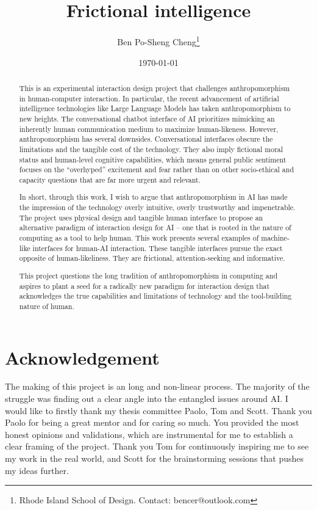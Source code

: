 \documentclass[12pt]{article}
\title{\sffamily{\small Master of Industrial Design Thesis} \\ \bfseries Frictional intelligence}
\author{Ben Po-Sheng Cheng\thanks{Rhode Island School of Design. Contact: bencer@outlook.com}}
\date{\today}
\begin{document}
\maketitle
\begin{abstract}
    This is an experimental interaction design project that challenges anthropomorphism in human-computer interaction. In particular, the recent advancement of artificial intelligence technologies like Large Language Models has taken anthropomorphism to new heights. The conversational chatbot interface of AI prioritizes mimicking an inherently human communication medium to maximize human-likeness. However, anthropomorphism has several downsides. Conversational interfaces obscure the limitations and the tangible cost of the technology. They also imply fictional moral status and human-level cognitive capabilities, which means general public sentiment focuses on the ``overhyped'' excitement and fear rather than on other socio-ethical and capacity questions that are far more urgent and relevant.

    In short, through this work, I wish to argue that anthropomorphism in AI has made the impression of the technology overly intuitive, overly trustworthy and impenetrable. The project uses physical design and tangible human interface to propose an alternative paradigm of interaction design for AI -- one that is rooted in the nature of computing as a tool to help human. This work presents several examples of machine-like interfaces for human-AI interaction. These tangible interfaces pursue the exact opposite of human-likeliness. They are frictional, attention-seeking and informative. 
    
    This project questions the long tradition of anthropomorphism in computing and aspires to plant a seed for a radically new paradigm for interaction design that acknowledges the true capabilities and limitations of technology and the tool-building nature of human. 
\end{abstract}
\newpage

\section*{Acknowledgement}
The making of this project is an long and non-linear process. The majority of the struggle was finding out a clear angle into the entangled issues around AI. I would like to firstly thank my thesis committee Paolo, Tom and Scott. Thank you Paolo for being a great mentor and for caring so much. You provided the most honest opinions and validations, which are instrumental for me to establish a clear framing of the project. Thank you Tom for continuously inspiring me to see my work in the real world, and Scott for the brainstorming sessions that pushes my ideas further.
\end{document}
